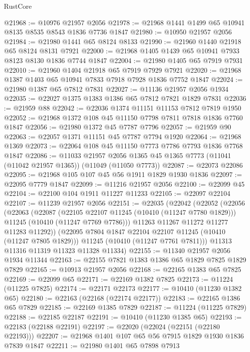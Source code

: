 \begin{lexlean}{RustCore}
\begin{coremodule}
@21968 := @10976 @21957 @2056
@21978 := @21968 @1441 @1499 @65 @10941 @8135 @8535 @8543 @1836 @7736 @1847
@21980 := @10950 @21957 @2056
@21984 := @21980 @1441 @65 @8124 @8133
@21990 := @21960 @1440 @21918 @65 @8124 @8131 @7921
@22000 := @21968 @1405 @1439 @65 @10941 @7933 @8123 @8130 @1836 @7744 @1847
@22004 := @21980 @1405 @65 @7919 @7931
@22010 := @21960 @1404 @21918 @65 @7919 @7929 @7921
@22020 := @21968 @1387 @1403 @65 @10941 @7833 @7918 @7928 @1836 @7752 @1847
@22024 := @21980 @1387 @65 @7812 @7831
@22027 := @11136 @21957 @2056 @1934
@22035 := @22027 @1375 @1383 @1386 @65 @7812 @7821 @1829 @7831
@22036 := @21959 @88
@22042 := @22036 @1374 @11151 @11153 @7812 @7819 @1950
@22052 := @21968 @1372 @108 @45 @11150 @7798 @7811 @7818 @1836 @7760 @1847
@22056 := @21980 @1372 @45 @7787 @7796
@22057 := @21959 @90
@22063 := @22057 @1371 @11151 @45 @7787 @7794 @1920
@22064 := @21968 @1369
@22073 := @22064 @108 @45 @11150 @7773 @7786 @7793 @1836 @7768 @1847
@22086 := @11033
    @21957
    @2056
    @1365
    @45
    @1365
    @7773
    (@11041 (@11042 @21957 @1365))
    (@11049 (@11050 @7773))
@22087 := @22073 @22086
@22095 := @21968 @105 @107 @45 @56 @1911 @1829 @1930 @1836
@22097 := @22095 @7779 @1847
@22099 := @11216 @21957 @2056
@22100 := @22099 @45
@22104 := @22100 @104 @1911 @11227 @11233
@22105 := @22097 @22104
@22107 := @11239 @21957 @2056
@22151 := @22035
    (@22042
      (@22052
        (@22056
          (@22063
            (@22087
              (@22105 @22107 @11245 (@10410 (@11247 @7780 @1829)))
              @11245
              (@10410 (@11247 @7769 @7786)))
            @11263
            @11267
            @11272
            @11277
            @11283
            @11292))
        (@22095 @7804 @1847 @22104 @22107 @11245 (@10410 (@11247 @7805 @1829)))
        @11245
        (@10410 (@11247 @7761 @7811)))
      @11313
      @11316
      @11319
      @11323
      @11328
      @11334)
@22155 := @11340 @21957 @2056 @1934 @11344
@22163 := @22155 @7821 @1383 @1386 @65 @1829 @7825 @1829 @7829
@22165 := @10913 @21957 @2056
@22168 := @22165 @1383 @65 @7825
@22169 := @22099 @65
@22171 := @22169 @1382 @7825
@22173 := @11224 (@11225 @7825)
@22174 := @22171 @22173
@22177 := @10410 (@11230 @1382 @65)
@22180 := @22163 (@22168 (@22174 @22177))
@22183 := @22165 @1386 @65 @7829
@22185 := @22169 @1385 @7829
@22187 := @11224 (@11225 @7829)
@22188 := @22185 @22187
@22191 := @10410 (@11230 @1385 @65)
@22193 := @22183 (@22188 @22191)
@22197 := @22020 (@22024 (@22151 (@22180 @22193)))
@22207 := @21968 @1401 @107 @65 @56 @7915 @1829 @1930 @1836 @7839 @1847
@22211 := @21980 @1401 @65 @7898 @7913

\end{coremodule}
\end{lexlean}
